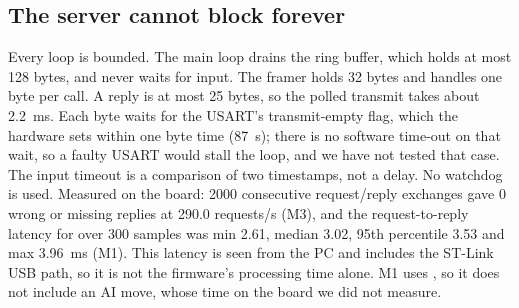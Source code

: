 \subsection{The server cannot block forever}
Every loop is bounded. The main loop drains the ring buffer, which holds at most 128 bytes, and never waits for input. The framer holds 32 bytes and handles one byte per call. A reply is at most 25 bytes, so the polled transmit
takes about 2.2~ms. Each byte waits for the USART's transmit-empty flag, which the hardware sets within one byte time (87~\textmu s); there is no software time-out on that wait, so a faulty USART would stall the loop, and we have not tested that case. The input timeout is a comparison of two timestamps, not a delay. No watchdog is used. Measured on the board: 2000 consecutive request/reply exchanges gave 0 wrong or missing replies at 290.0 requests/s (M3), and the request-to-reply latency for  over 300 samples was min 2.61, median 3.02, 95th percentile 3.53 and max 3.96~ms (M1). This latency is seen from the PC and includes the ST-Link USB path, so it is not the firmware's processing time alone. M1 uses , so it does not include an AI move, whose time on the board we did not measure.
